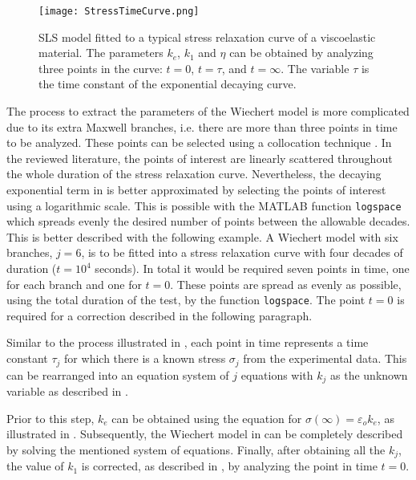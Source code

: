 \begin{figure}[htb!]
	\centering
    \texttt{[image: StressTimeCurve.png]}
    \caption{SLS model fitted to a typical stress relaxation curve of a viscoelastic material. The parameters $k_e$, $k_1$ and $\eta$ can be obtained by analyzing three points in the curve: $t=0$, $t=\tau$, and $t=\infty$. The variable $\tau$ is the time constant of the exponential decaying curve.}
    \label{fig:stressTimeCurve}
\end{figure}

The process to extract the parameters of the Wiechert model is more complicated due to its extra Maxwell branches, i.e. there are more than three points in time to be analyzed. These points can be selected using a collocation technique \cite{roylance2001engineering,machiraju2006viscoelastic}. In the reviewed literature, the points of interest are linearly scattered throughout the whole duration of the stress relaxation curve. Nevertheless, the decaying exponential term in  is better approximated by selecting the points of interest using a logarithmic scale. This is possible with the MATLAB function \texttt{logspace} which spreads evenly the desired number of points between the allowable decades. 
This is better described with the following example. A Wiechert model with six branches, $j=6$, is to be fitted into a stress relaxation curve with four decades of duration ($t=10^4$ seconds). In total it would be required seven points in time, one for each branch and one for $t=0$. These points are spread as evenly as possible, using the total duration of the test, by the function \texttt{logspace}. The point $t=0$ is required for a correction described in the following paragraph. 

Similar to the process illustrated in , each point in time represents a time constant $\tau_j$ for which there is a known stress $\sigma_j$ from the experimental data. This can be rearranged into an equation system of $j$ equations with $k_j$ as the unknown variable as described in \cite{machiraju2006viscoelastic}. 


Prior to this step, $k_e$ can be obtained using the equation for $\sigma(\infty)=\varepsilon_o k_e$, as illustrated in . Subsequently, the Wiechert model in  can be completely described by solving the mentioned system of equations. Finally, after obtaining all the $k_j$, the value of $k_1$ is corrected, as described in \cite{roylance2001engineering}, by analyzing the point in time $t=0$.

